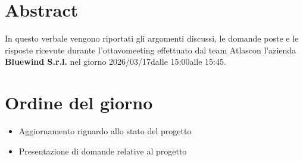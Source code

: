 \documentclass[a4paper,12pt]{article}
\newcommand{\Gruppo}{Atlas}
\newcommand{\DataVerbale}{2026/03/17}
\newcommand{\NumeroVerbaleEsterno}{ottavo}
\newcommand{\OraInizio}{15:00}
\newcommand{\OraFine}{15:45}
\newcommand{\AbstractVerbale}{
    In questo verbale vengono riportati gli argomenti discussi, le domande poste e le risposte ricevute durante l'\NumeroVerbaleEsterno \space meeting effettuato dal team \Gruppo \space con l'azienda \textbf{Bluewind S.r.l.} nel giorno \DataVerbale \space dalle \OraInizio \space alle \OraFine.
}
\begin{document}
\newpage

\tableofcontents

\newpage


\section{Abstract}{
    \begin{minipage}{0.9\textwidth}
        \small
        \AbstractVerbale
    \end{minipage}
}


\section{Ordine del giorno}{
    \begin{itemize}
        \item Aggiornamento riguardo allo stato del progetto
        \item Presentazione di domande relative al progetto
    \end{itemize}
}
\end{document}
